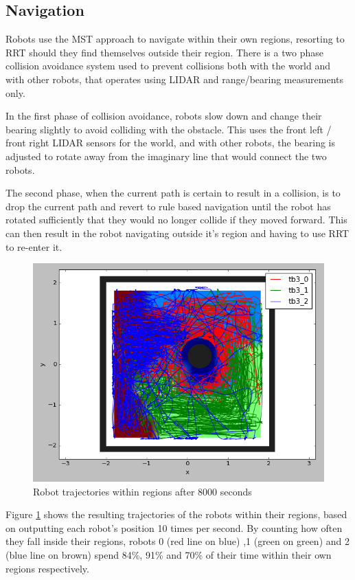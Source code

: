 \documentclass[a4paper, 10pt, conference]{ieeeconf}      %
\begin{document}
\subsection{Navigation}
Robots use the MST approach to navigate within their own regions, resorting to RRT should they find themselves outside their region. There is a two phase collision avoidance system used to prevent collisions both with the world and with other robots, that operates using LIDAR and range/bearing measurements only.

In the first phase of collision avoidance, robots slow down and change their bearing slightly to avoid colliding with the obstacle. This uses the front left / front right LIDAR sensors for the world, and with other robots, the bearing is adjusted to rotate away from the imaginary line that would connect the two robots.

The second phase, when the current path is certain to result in a collision, is to drop the current path and revert to rule based navigation until the robot has rotated sufficiently that they would no longer collide if they moved forward. This can then result in the robot navigating outside it's region and having to use RRT to re-enter it.

\begin{figure}
	\includegraphics[width=\columnwidth]{dec_t2_cover.png}
	\caption{Robot trajectories within regions after 8000 seconds}
    \label{fig:decCover}
\end{figure}


Figure \ref{fig:decCover} shows the resulting trajectories of the robots within their regions, based on outputting each robot's position 10 times per second. By counting how often they fall inside their regions, robots 0 (red line on blue) ,1 (green on green) and 2 (blue line on brown) spend 84\%, 91\% and 70\% of their time within their own regions respectively.
\end{document}
